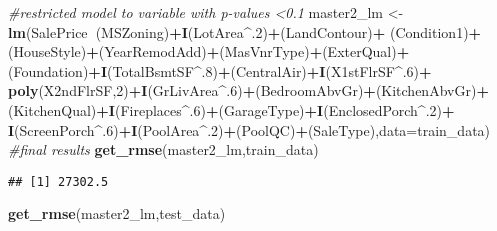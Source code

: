 \documentclass[]{article}
\newenvironment{Shaded}{\begin{snugshade}}{\end{snugshade}}
\newcommand{\CommentTok}[1]{\textcolor[rgb]{0.56,0.35,0.01}{\textit{#1}}}
\newcommand{\DataTypeTok}[1]{\textcolor[rgb]{0.13,0.29,0.53}{#1}}
\newcommand{\DecValTok}[1]{\textcolor[rgb]{0.00,0.00,0.81}{#1}}
\newcommand{\KeywordTok}[1]{\textcolor[rgb]{0.13,0.29,0.53}{\textbf{#1}}}
\newcommand{\NormalTok}[1]{#1}
\newcommand{\OperatorTok}[1]{\textcolor[rgb]{0.81,0.36,0.00}{\textbf{#1}}}
\newcommand{\StringTok}[1]{\textcolor[rgb]{0.31,0.60,0.02}{#1}}
\begin{document}
\begin{Shaded}
\begin{Highlighting}[]
\CommentTok{#restricted model to variable with p-values <0.1}
\NormalTok{master2_lm <-}\StringTok{ }\KeywordTok{lm}\NormalTok{(SalePrice}\OperatorTok{~}\NormalTok{(MSZoning)}\OperatorTok{+}\KeywordTok{I}\NormalTok{(LotArea}\OperatorTok{^}\NormalTok{.}\DecValTok{2}\NormalTok{)}\OperatorTok{+}\NormalTok{(LandContour)}\OperatorTok{+}
\StringTok{    }\NormalTok{(Condition1)}\OperatorTok{+}\NormalTok{(HouseStyle)}\OperatorTok{+}\NormalTok{(YearRemodAdd)}\OperatorTok{+}\NormalTok{(MasVnrType)}\OperatorTok{+}\NormalTok{(ExterQual)}\OperatorTok{+}
\StringTok{    }\NormalTok{(Foundation)}\OperatorTok{+}\KeywordTok{I}\NormalTok{(TotalBsmtSF}\OperatorTok{^}\NormalTok{.}\DecValTok{8}\NormalTok{)}\OperatorTok{+}\NormalTok{(CentralAir)}\OperatorTok{+}\KeywordTok{I}\NormalTok{(X1stFlrSF}\OperatorTok{^}\NormalTok{.}\DecValTok{6}\NormalTok{)}\OperatorTok{+}
\StringTok{    }\KeywordTok{poly}\NormalTok{(X2ndFlrSF,}\DecValTok{2}\NormalTok{)}\OperatorTok{+}\KeywordTok{I}\NormalTok{(GrLivArea}\OperatorTok{^}\NormalTok{.}\DecValTok{6}\NormalTok{)}\OperatorTok{+}\NormalTok{(BedroomAbvGr)}\OperatorTok{+}\NormalTok{(KitchenAbvGr)}\OperatorTok{+}
\StringTok{    }\NormalTok{(KitchenQual)}\OperatorTok{+}\KeywordTok{I}\NormalTok{(Fireplaces}\OperatorTok{^}\NormalTok{.}\DecValTok{6}\NormalTok{)}\OperatorTok{+}\NormalTok{(GarageType)}\OperatorTok{+}\KeywordTok{I}\NormalTok{(EnclosedPorch}\OperatorTok{^}\NormalTok{.}\DecValTok{2}\NormalTok{)}\OperatorTok{+}
\StringTok{    }\KeywordTok{I}\NormalTok{(ScreenPorch}\OperatorTok{^}\NormalTok{.}\DecValTok{6}\NormalTok{)}\OperatorTok{+}\KeywordTok{I}\NormalTok{(PoolArea}\OperatorTok{^}\NormalTok{.}\DecValTok{2}\NormalTok{)}\OperatorTok{+}\NormalTok{(PoolQC)}\OperatorTok{+}\NormalTok{(SaleType),}\DataTypeTok{data=}\NormalTok{train_data)}
\CommentTok{#final results}
\KeywordTok{get_rmse}\NormalTok{(master2_lm,train_data)}
\end{Highlighting}
\end{Shaded}

\begin{verbatim}
## [1] 27302.5
\end{verbatim}

\begin{Shaded}
\begin{Highlighting}[]
\KeywordTok{get_rmse}\NormalTok{(master2_lm,test_data)}
\end{Highlighting}
\end{Shaded}
\end{document}
